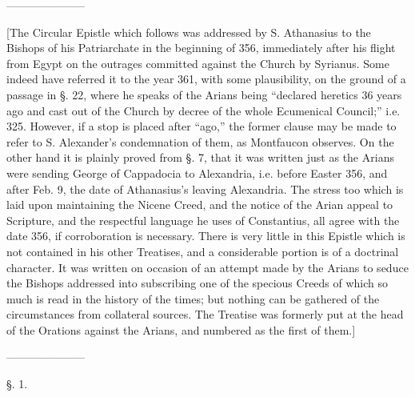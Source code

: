 
———————

[The Circular Epistle which follows was addressed
by S. Athanasius to the Bishops of his Patriarchate in the beginning
of 356, immediately after his flight from Egypt on the outrages
committed against the Church by Syrianus. Some indeed have referred it
to the year 361, with some plausibility, on the ground of a passage in
§. 22, where he speaks of the Arians being ``declared heretics 36
years ago and cast out of the Church by decree of the whole Ecumenical
Council;'' i.e. 325. However, if a stop is placed after ``ago,'' the
former clause may be made to refer to S. Alexander's condemnation of
them, as Montfaucon observes. On the other hand it is plainly proved
from §. 7, that it was written just as the Arians were sending George
of Cappadocia to Alexandria, i.e. before Easter 356, and after Feb. 9,
the date of Athanasius's leaving Alexandria. The stress too which is
laid upon maintaining the Nicene Creed, and the notice of the Arian
appeal to Scripture, and the respectful language he uses of
Constantius, all agree with the date 356, if corroboration is
necessary. There is very little in this Epistle which is not contained
in his other Treatises, and a considerable portion is of a doctrinal
character. It was written on occasion of an attempt made by the Arians
to seduce the Bishops addressed into subscribing one of the specious
Creeds of which so much is read in the history of the times; but
nothing can be gathered of the circumstances from collateral sources.
The Treatise was formerly put at the head of the Orations against the
Arians, and numbered as the first of them.]

———————


§. 1.

